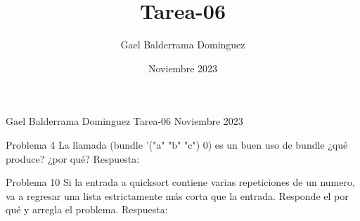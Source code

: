 \documentclass{article}
\author{Gael Balderrama Dominguez}
\title{Tarea-06}
\date{Noviembre 2023}
\begin{document}
\begin{center}
    Gael Balderrama Dominguez \linebreak
    Tarea-06 \linebreak
    Noviembre 2023 \linebreak
\end{center}
    Problema 4 \newline
    La llamada (bundle '("a" "b" "c") 0) es un buen uso de bundle ¿qué produce? ¿por qué? \newline
    Respuesta: \newline


    Problema 10 \newline
    Si la entrada a quicksort contiene varias repeticiones de un numero, va a regresar una lista estrictamente más corta que la entrada. Responde
    el por qué y arregla el problema. \newline
    Respuesta: \newline
\end{document}
